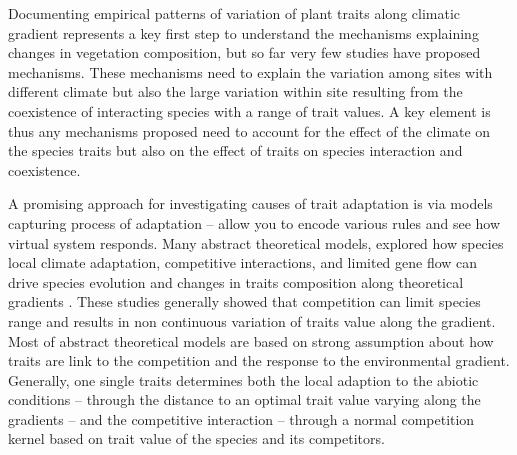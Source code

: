 \documentclass[a4paper,11pt]{article}
\begin{document}



Documenting empirical patterns of variation of plant traits along climatic gradient represents a key first step to understand the mechanisms explaining changes in vegetation composition, but so far very few studies have proposed mechanisms. These mechanisms need to explain the variation among sites with different climate but also the large variation within site resulting from the coexistence of interacting species with a range of trait values. A key element is thus any mechanisms proposed need to account for the effect of the climate on the species traits but also on the effect of traits on species interaction and coexistence.

A promising approach for investigating causes of trait adaptation is via models capturing process of adaptation -- allow you to encode various rules and see how virtual system responds. Many abstract theoretical models, explored how species local climate adaptation, competitive interactions, and limited gene flow can drive species evolution and changes in traits composition along theoretical gradients \citep{Case-2000,Doebeli-2003,Goldberg-2006,Leimar-2008}. These studies generally showed that competition can limit species range and results in non continuous variation of traits value along the gradient. Most of abstract theoretical models are based on strong assumption about how traits are link to the competition and the response to the environmental gradient. Generally, one single traits determines both the local adaption to the abiotic conditions -- through the distance to an optimal trait value varying along the gradients -- and the competitive interaction -- through a normal competition kernel based on trait value of the species and its competitors. 
\end{document}
